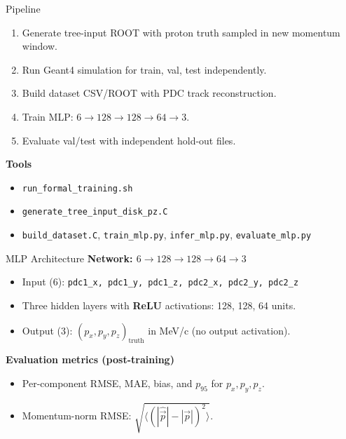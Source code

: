 \documentclass[11pt]{beamer}
\begin{document}
\begin{frame}{Pipeline}
\begin{enumerate}
\item Generate tree-input ROOT with proton truth sampled in new momentum window.
\item Run Geant4 simulation for train, val, test independently.
\item Build dataset CSV/ROOT with PDC track reconstruction.
\item Train MLP: \(6 \rightarrow 128 \rightarrow 128 \rightarrow 64 \rightarrow 3\).
\item Evaluate val/test with independent hold-out files.
\end{enumerate}

\textbf{Tools}
\begin{itemize}
\item \texttt{run\_formal\_training.sh}
\item \texttt{generate\_tree\_input\_disk\_pz.C}
\item \texttt{build\_dataset.C}, \texttt{train\_mlp.py}, \texttt{infer\_mlp.py}, \texttt{evaluate\_mlp.py}
\end{itemize}
\end{frame}

\begin{frame}{MLP Architecture}
\textbf{Network: \(6 \rightarrow 128 \rightarrow 128 \rightarrow 64 \rightarrow 3\)}
\begin{itemize}
  \item Input (6): \texttt{pdc1\_x, pdc1\_y, pdc1\_z, pdc2\_x, pdc2\_y, pdc2\_z}
  \item Three hidden layers with \textbf{ReLU} activations: 128, 128, 64 units.
  \item Output (3): \((p_x, p_y, p_z)_\text{truth}\) in MeV/c (no output activation).
\end{itemize}

\textbf{Evaluation metrics (post-training)}
\begin{itemize}
  \item Per-component RMSE, MAE, bias, and \(p_{95}\) for \(p_x, p_y, p_z\).
  \item Momentum-norm RMSE: \(\sqrt{\langle(|\hat{\vec{p}}| - |\vec{p}|)^2\rangle}\).
\end{itemize}
\end{frame}
\end{document}
